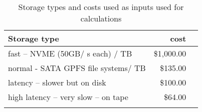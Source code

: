 \tiny \begin{longtable} { |p{}  |r  |r |} 
\caption{Storage types and costs used as inputs used for calculations \label{tab:Storage}}\\ 
\hline 
\textbf{Storage type }&\textbf{cost} \\ \hline
{fast -- NVME (50GB/ s each) / TB  }&{\$1,000.00} \\ \hline
{normal - SATA GPFS file systems/ TB  }&{\$135.00} \\ \hline
{latency -- slower but on disk }&{\$100.00} \\ \hline
{high latency -- very slow -- on tape }&{\$64.00} \\ \hline
{}&{} \\ \hline
\end{longtable} \normalsize
